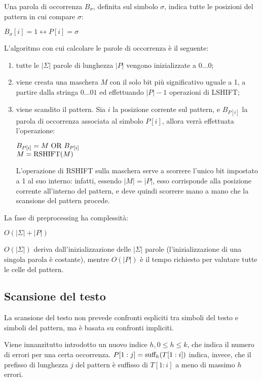 Una parola di occorrenza $B_{\sigma}$, definita sul simbolo $\sigma$, indica tutte le posizioni del pattern in cui compare $\sigma$:
\begin{center}
    $B_{\sigma}[i] = 1 \longleftrightarrow P[i] = \sigma$
\end{center}
L'algoritmo con cui calcolare le parole di occorrenza è il seguente:
\begin{enumerate}
    \item tutte le $|\Sigma|$ parole di lunghezza $|P|$ vengono inizializzate a $0\ldots0$;
    \item viene creata una maschera $M$ con il solo bit più significativo uguale a 1, a partire dalla stringa $0\ldots01$ ed effettuando $|P| - 1$ operazioni di LSHIFT;
    \item viene scandito il pattern.
    Sia $i$ la posizione corrente sul pattern, e $B_{P[i]}$ la parola di occorrenza associata al simbolo $P[i]$, allora verrà effettuata l'operazione:
    \begin{center}
        $B_{P[i]} = M \textnormal{ OR } B_{P[i]}$\\
        $M = \textnormal{RSHIFT}(M)$
    \end{center}
    L'operazione di RSHIFT sulla maschera serve a scorrere l'unico bit impostato a 1 al suo interno: infatti, essendo $|M| = |P|$, esso corrisponde alla posizione corrente all'interno del pattern, e deve quindi scorrere mano a mano che la scansione del pattern procede.
\end{enumerate}
La fase di preprocessing ha complessità:
\begin{center}
    $O(|\Sigma| + |P|)$
\end{center}
$O(|\Sigma|)$ deriva dall'inizializzazione delle $|\Sigma|$ parole (l'inizializzazione di una singola parola è costante), mentre $O(|P|)$ è il tempo richiesto per valutare tutte le celle del pattern.

\subsection*{Scansione del testo}
La scansione del testo non prevede confronti espliciti tra simboli del testo e simboli del pattern, ma è basata su confronti impliciti.

Viene innanzitutto introdotto un nuovo indice $h, 0 \le h \le k$, che indica il numero di errori per una certa occorrenza.
$P[1:j] = \textnormal{suff}_h(T[1:i])$ indica, invece, che il prefisso di lunghezza $j$ del pattern è suffisso di $T[1:i]$ a meno di massimo $h$ errori.

